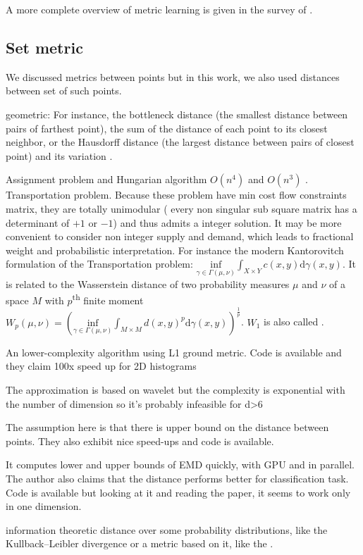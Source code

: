 A more complete overview of metric learning is given in the survey of \textcite{MetricSurvey13}.

\subsection{Set metric}
We discussed metrics between points but in this work, we also used distances between set of such points.

geometric: For instance, the bottleneck distance \autocite{Bottleneck96} (the smallest distance between pairs of farthest point), the sum of the distance of each point to its closest neighbor, or the Hausdorff distance (the largest distance between pairs of closest point) and its variation \autocite{ModifiedHausdorff94}.

Assignment problem and Hungarian algorithm $O(n^4)$ and $O(n^3)$ \autocite{Hungarian57}. Transportation problem. Because these problem have min cost flow constraints matrix, they are totally unimodular (\ie{} every non singular sub square matrix has a determinant of $+1$ or $-1$) and thus admits a integer solution.
It may be more convenient to consider non integer supply and demand, which leads to fractional weight and probabilistic interpretation. For instance the modern Kantorovitch formulation of the Transportation problem: $\underset{\gamma \in \Gamma(\mu, \nu)}{\mathrm{inf}} \int_{X\times Y} c(x,y)\mathrm{d}\gamma(x,y)$. It is related to the Wasserstein distance of two probability measures $\mu$ and $\nu$ of a space $M$ with $p$\textsuperscript{th} finite moment
$W_p(\mu, \nu) = \left( \underset{\gamma \in \Gamma(\mu, \nu)}{\mathrm{inf}} \int_{M\times M} d(x,y)^p\mathrm{d}\gamma(x,y)\right)^{\frac{1}{p}}$. $W_1$ is also called  \autocite{EMD98}.


An lower-complexity algorithm using L1 ground metric. Code is available and they claim 100x speed up for 2D histograms \autocite{Ling2007}

The approximation is based on wavelet but the complexity is exponential with the number of dimension so it's probably infeasible for d>6 \autocite{Shirdhonkar2008}

The assumption here is that there is upper bound on the distance between points. They also exhibit nice speed-ups and code is available. \autocite{Pele2009}

It computes lower and upper bounds of EMD quickly, with GPU and in parallel. The author also claims that the distance performs better for classification task. Code is available but looking at it and reading the paper, it seems to work only in one dimension. \autocite{FastEMD13}


information theoretic distance over some probability distributions, like the Kullback--Leibler divergence or a metric based on it, like the  \autocite{JensenShannon03}.
